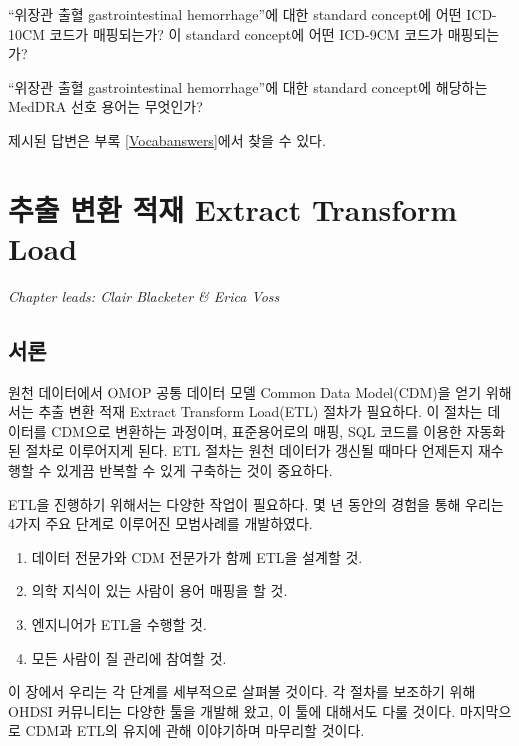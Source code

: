 \documentclass[10.5pt]{book}
\providecommand{\tightlist}{%
  \setlength{\itemsep}{0pt}\setlength{\parskip}{0pt}}
\theoremstyle{definition}
\theoremstyle{definition}
\theoremstyle{definition}
\theoremstyle{remark}
\let\BeginKnitrBlock\begin \let\EndKnitrBlock\end
\begin{document}
\BeginKnitrBlock{exercise}
\protect\hypertarget{exr:exerciseVocab2}{}{\label{exr:exerciseVocab2}
}``위장관 출혈 gastrointestinal hemorrhage''에 대한 standard concept에
어떤 ICD-10CM 코드가 매핑되는가? 이 standard concept에 어떤 ICD-9CM
코드가 매핑되는가?
\EndKnitrBlock{exercise}

\BeginKnitrBlock{exercise}
\protect\hypertarget{exr:exerciseVocab3}{}{\label{exr:exerciseVocab3}
}``위장관 출혈 gastrointestinal hemorrhage''에 대한 standard concept에
해당하는 MedDRA 선호 용어는 무엇인가?
\EndKnitrBlock{exercise}

제시된 답변은 부록 \ref{Vocabanswers}에서 찾을 수 있다.

\chapter{추출 변환 적재 Extract Transform
Load}\label{ExtractTransformLoad}

\emph{Chapter leads: Clair Blacketer \& Erica Voss}

\section{서론}

원천 데이터에서 OMOP 공통 데이터 모델 Common Data Model(CDM)을 얻기
위해서는 추출 변환 적재 Extract Transform Load(ETL) 절차가 필요하다. 이
절차는 데이터를 CDM으로 변환하는 과정이며, 표준용어로의 매핑, SQL 코드를
이용한 자동화된 절차로 이루어지게 된다. ETL 절차는 원천 데이터가 갱신될
때마다 언제든지 재수행할 수 있게끔 반복할 수 있게 구축하는 것이
중요하다. 
 

ETL을 진행하기 위해서는 다양한 작업이 필요하다. 몇 년 동안의 경험을 통해
우리는 4가지 주요 단계로 이루어진 모범사례를 개발하였다.

\begin{enumerate}
\def\labelenumi{\arabic{enumi}.}
\tightlist
\item
  데이터 전문가와 CDM 전문가가 함께 ETL을 설계할 것.
\item
  의학 지식이 있는 사람이 용어 매핑을 할 것.
\item
  엔지니어가 ETL을 수행할 것.
\item
  모든 사람이 질 관리에 참여할 것.
\end{enumerate}

이 장에서 우리는 각 단계를 세부적으로 살펴볼 것이다. 각 절차를 보조하기
위해 OHDSI 커뮤니티는 다양한 툴을 개발해 왔고, 이 툴에 대해서도 다룰
것이다. 마지막으로 CDM과 ETL의 유지에 관해 이야기하며 마무리할 것이다.
\end{document}
